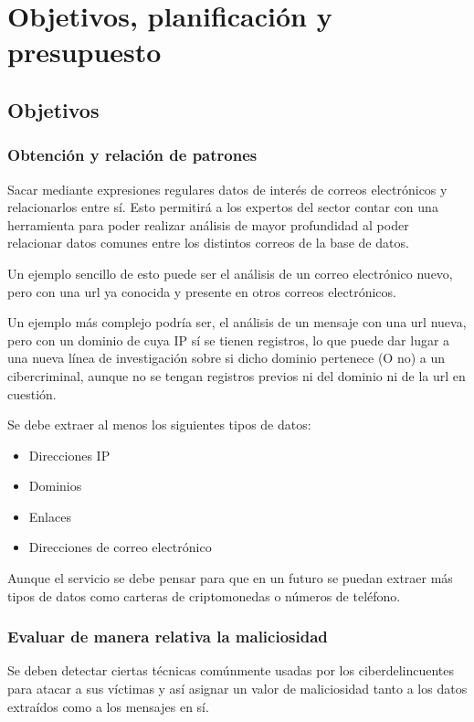 \chapter{Objetivos, planificación y presupuesto}
\section{Objetivos}\label{objetivos}
\subsection{Obtención y relación de patrones}
Sacar mediante expresiones regulares datos de interés de correos electrónicos y relacionarlos entre sí. Esto permitirá a los expertos del sector contar con una herramienta para poder realizar análisis de mayor profundidad al poder relacionar datos comunes entre los distintos correos de la base de datos. 

Un ejemplo sencillo de esto puede ser el análisis de un correo electrónico nuevo, pero con una url ya conocida y presente en otros correos electrónicos. 

Un ejemplo más complejo podría ser, el análisis de un mensaje con una url nueva, pero con un dominio de cuya IP sí se tienen registros, lo que puede dar lugar a una nueva línea de investigación sobre si dicho dominio pertenece (O no) a un cibercriminal, aunque no se tengan registros previos ni del dominio ni de la url en cuestión. 

Se debe extraer al menos los siguientes tipos de datos:
\begin{itemize}
    \item Direcciones IP
    \item Dominios
    \item Enlaces
    \item Direcciones de correo electrónico
\end{itemize}

Aunque el servicio se debe pensar para que en un futuro se puedan extraer más tipos de datos como carteras de criptomonedas o números de teléfono.

\subsection{Evaluar de manera relativa la maliciosidad}
Se deben detectar ciertas técnicas comúnmente usadas por los ciberdelincuentes para atacar a sus víctimas y así asignar un valor de maliciosidad tanto a los datos extraídos como a los mensajes en sí. 

